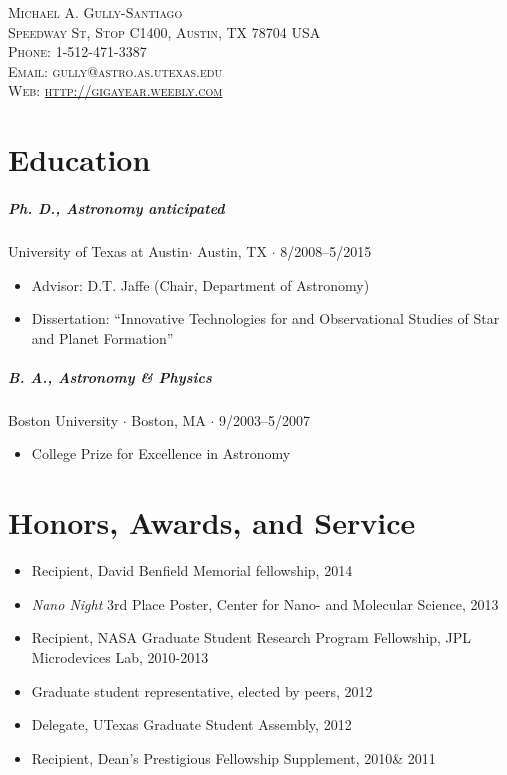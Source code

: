 \documentclass[10pt,letterpaper]{article}
\newcommand{\namestyle}{\Huge \scshape}
\newcommand{\addressstyle}{\color{addresscolor}  \footnotesize \sffamily \upshape}
\begin{document}
\begin{flushright}
    \namestyle Michael A. Gully-Santiago \\[0.3em]
    \addressstyle 
    2515 Speedway St, Stop C1400, Austin, TX 78704 USA \\
    Phone: 1-512-471-3387\\
    Email: gully@astro.as.utexas.edu \\
    Web: \url{http://gigayear.weebly.com}
\end{flushright}

\small

\section*{Education}

\subparagraph{Ph. D., Astronomy \emph{anticipated}}
University of Texas at Austin$\cdot$ Austin, TX $\cdot$ 8/2008--5/2015
\begin{itemize}
    \item Advisor: D.T. Jaffe (Chair, Department of Astronomy)
    \item Dissertation: ``Innovative Technologies for and Observational Studies of Star and Planet Formation''
\end{itemize}

\subparagraph{B. A., Astronomy \& Physics}
Boston University $\cdot$ Boston, MA $\cdot$ 9/2003--5/2007
\begin{itemize}
    \item College Prize for Excellence in Astronomy
\end{itemize}


\section*{Honors, Awards, and Service}

\begin{itemize}
    \item Recipient, David Benfield Memorial fellowship, 2014
    \item \emph{Nano Night} 3rd Place Poster, Center for Nano- and Molecular Science, 2013
    \item Recipient, NASA Graduate Student Research Program Fellowship, JPL Microdevices Lab, 2010-2013
    \item Graduate student representative, elected by peers, 2012
    \item Delegate, UTexas Graduate Student Assembly, 2012 
    \item Recipient, Dean's Prestigious Fellowship Supplement, 2010\& 2011
\end{itemize}
\end{document}
